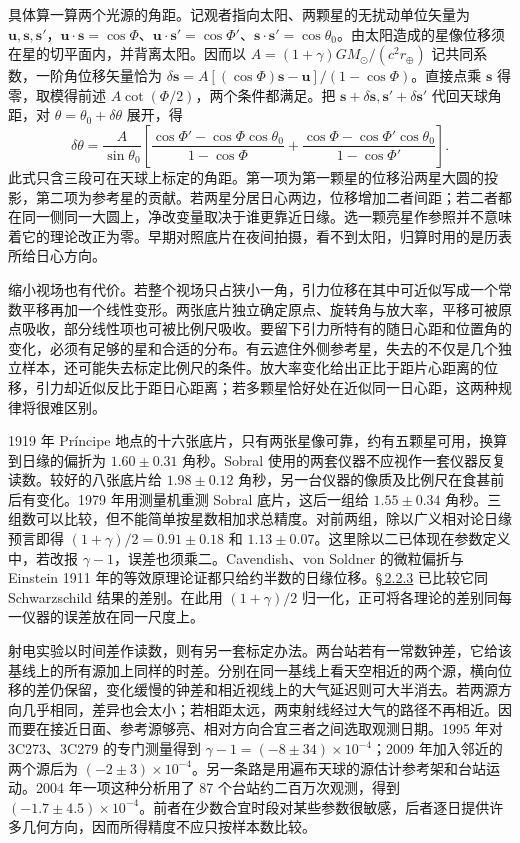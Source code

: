 具体算一算两个光源的角距。记观者指向太阳、两颗星的无扰动单位矢量为 $\bm u,\bm s,\bm s'$，$\bm u\cdot\bm s=\cos\Phi$、$\bm u\cdot\bm s'=\cos\Phi'$、$\bm s\cdot\bm s'=\cos\theta_0$。由太阳造成的星像位移须在星的切平面内，并背离太阳。因而以 $A=(1+\gamma)GM_\odot/(c^2r_\oplus)$ 记共同系数，一阶角位移矢量恰为 $\delta\bm s=A[(\cos\Phi)\bm s-\bm u]/(1-\cos\Phi)$。直接点乘 $\bm s$ 得零，取模得前述 $A\cot(\Phi/2)$，两个条件都满足。把 $\bm s+\delta\bm s,\bm s'+\delta\bm s'$ 代回天球角距，对 $\theta=\theta_0+\delta\theta$ 展开，得
\[
 \delta\theta=\frac{A}{\sin\theta_0}
  \left[
    \frac{\cos\Phi'-\cos\Phi\cos\theta_0}{1-\cos\Phi}
    +\frac{\cos\Phi-\cos\Phi'\cos\theta_0}{1-\cos\Phi'}
  \right].
\]
此式只含三段可在天球上标定的角距。第一项为第一颗星的位移沿两星大圆的投影，第二项为参考星的贡献。若两星分居日心两边，位移增加二者间距；若二者都在同一侧同一大圆上，净改变量取决于谁更靠近日缘。选一颗亮星作参照并不意味着它的理论改正为零。早期对照底片在夜间拍摄，看不到太阳，归算时用的是历表所给日心方向。

缩小视场也有代价。若整个视场只占狭小一角，引力位移在其中可近似写成一个常数平移再加一个线性变形。两张底片独立确定原点、旋转角与放大率，平移可被原点吸收，部分线性项也可被比例尺吸收。要留下引力所特有的随日心距和位置角的变化，必须有足够的星和合适的分布。有云遮住外侧参考星，失去的不仅是几个独立样本，还可能失去标定比例尺的条件。放大率变化给出正比于距片心距离的位移，引力却近似反比于距日心距离；若多颗星恰好处在近似同一日心距，这两种规律将很难区别。

1919 年 Príncipe 地点的十六张底片，只有两张星像可靠，约有五颗星可用，换算到日缘的偏折为 $1.60\pm0.31$ 角秒。Sobral 使用的两套仪器不应视作一套仪器反复读数。较好的八张底片给 $1.98\pm0.12$ 角秒，另一台仪器的像质及比例尺在食甚前后有变化。1979 年用测量机重测 Sobral 底片，这后一组给 $1.55\pm0.34$ 角秒。三组数可以比较，但不能简单按星数相加求总精度。对前两组，除以广义相对论日缘预言即得 $(1+\gamma)/2=0.91\pm0.18$ 和 $1.13\pm0.07$。这里除以二已体现在参数定义中，若改报 $\gamma-1$，误差也须乘二。Cavendish、von Soldner 的微粒偏折与 Einstein 1911 年的等效原理论证都只给约半数的日缘位移。\hyperlink{subsection.2.2.3}{\S\,2.2.3} 已比较它同 Schwarzschild 结果的差别。在此用 $(1+\gamma)/2$ 归一化，正可将各理论的差别同每一仪器的误差放在同一尺度上。

射电实验以时间差作读数，则有另一套标定办法。两台站若有一常数钟差，它给该基线上的所有源加上同样的时差。分别在同一基线上看天空相近的两个源，横向位移的差仍保留，变化缓慢的钟差和相近视线上的大气延迟则可大半消去。若两源方向几乎相同，差异也会太小；若相距太远，两束射线经过大气的路径不再相近。因而要在接近日面、参考源够亮、相对方向合宜三者之间选取观测日期。1995 年对 3C273、3C279 的专门测量得到 $\gamma-1=(-8\pm34)\times10^{-4}$；2009 年加入邻近的两个源后为 $(-2\pm3)\times10^{-4}$。另一条路是用遍布天球的源估计参考架和台站运动。2004 年一项这种分析用了 87 个台站约二百万次观测，得到 $(-1.7\pm4.5)\times10^{-4}$。前者在少数合宜时段对某些参数很敏感，后者逐日提供许多几何方向，因而所得精度不应只按样本数比较。

